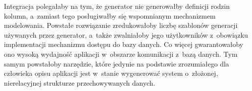 Integracja polegałaby na tym, że generator nie generowałby definicji rodzin kolumn, a~zamiast tego posługiwałby się wspomnianym mechanizmem modelowania.
Powstałe rozwiązanie zredukowałoby liczbę szablonów generacji używanych przez generator, a~także zwalniałoby jego użytkowników z~obowiązku implementacji mechanizmu dostępu do bazy danych.
Co więcej gwarantowałoby ono wysoką wydajność aplikacji w~obszarze komunikacji z~bazą danych.
Tym samym powstałoby narzędzie, które jedynie na podstawie zrozumiałego dla człowieka opisu aplikacji jest w~stanie wygenerować system o~złożonej, nierelacyjnej strukturze przechowywanych danych.
